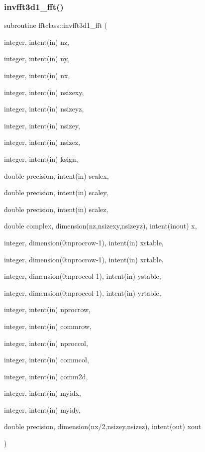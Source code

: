 \subsubsection{\texorpdfstring{invfft3d1\_fft()}{invfft3d1\_fft()}}
{\footnotesize\ttfamily subroutine fftclass\+::invfft3d1\+\_\+fft (\begin{DoxyParamCaption}\item[{integer, intent(in)}]{nz,  }\item[{integer, intent(in)}]{ny,  }\item[{integer, intent(in)}]{nx,  }\item[{integer, intent(in)}]{nsizexy,  }\item[{integer, intent(in)}]{nsizeyz,  }\item[{integer, intent(in)}]{nsizey,  }\item[{integer, intent(in)}]{nsizez,  }\item[{integer, intent(in)}]{ksign,  }\item[{double precision, intent(in)}]{scalex,  }\item[{double precision, intent(in)}]{scaley,  }\item[{double precision, intent(in)}]{scalez,  }\item[{double complex, dimension(nz,nsizexy,nsizeyz), intent(inout)}]{x,  }\item[{integer, dimension(0\+:nprocrow-\/1), intent(in)}]{xstable,  }\item[{integer, dimension(0\+:nprocrow-\/1), intent(in)}]{xrtable,  }\item[{integer, dimension(0\+:nproccol-\/1), intent(in)}]{ystable,  }\item[{integer, dimension(0\+:nproccol-\/1), intent(in)}]{yrtable,  }\item[{integer, intent(in)}]{nprocrow,  }\item[{integer, intent(in)}]{commrow,  }\item[{integer, intent(in)}]{nproccol,  }\item[{integer, intent(in)}]{commcol,  }\item[{integer, intent(in)}]{comm2d,  }\item[{integer, intent(in)}]{myidx,  }\item[{integer, intent(in)}]{myidy,  }\item[{double precision, dimension(nx/2,nsizey,nsizez), intent(out)}]{xout }\end{DoxyParamCaption})}

